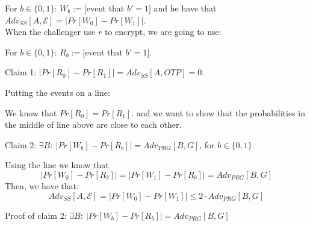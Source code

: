 \documentclass[12pt]{book}
\begin{document}
For $b\in\{0,1\}$: $W_{b}:=[$event that $b'=1]$ and he have that $Adv_{SS}[A,\mathcal{E}]=\Big|Pr[W_{0}]-Pr[W_{1}]\Big|$.\\
When the challenger use $r$ to encrypt, we are going to use:

For $b\in\{0,1\}$: $R_{b}:=[$event that $b'=1]$.

Claim 1: $\Big|Pr[R_{0}]-Pr[R_{1}]\Big|=Adv_{SS}[A,OTP]=0$.

Putting the events on a line:
\begin{center}
\end{center}We know that $Pr[R_{0}]=Pr[R_{1}]$. and we want to show that the probabilities in the middle of line above are close to each other.

Claim 2: $\exists B:\ \Big|Pr[W_{b}]-Pr[R_{b}]\Big|=Adv_{PRG}[B,G]$, for $b\in\{0,1\}$.

Using the line we know that
$$\Big|Pr[W_{0}]-Pr[R_{b}]\Big|=\Big|Pr[W_{1}]-Pr[R_{b}]\Big|=Adv_{PRG}[B,G]$$
Then, we have that:
$$Adv_{SS}[A,\mathcal{E}]=\Big|Pr[W_{0}]-Pr[W_{1}]\Big|\leq 2\cdot Adv_{PRG}[B,G]$$

Proof of claim 2: $\exists B:\ \Big|Pr[W_{b}]-Pr[R_{b}]\Big|=Adv_{PRG}[B,G]$
\end{document}
